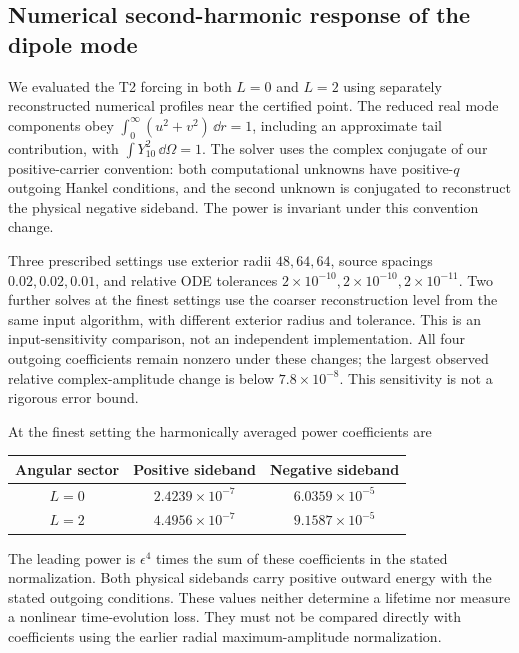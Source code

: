 \subsection{Numerical second-harmonic response of the dipole mode}
\label{nl:dipole-response}
We evaluated the T2 forcing in both $L=0$ and $L=2$ using separately
reconstructed numerical profiles near the certified point. The reduced
real mode components obey $\int_0^\infty(u^2+v^2)\,\dd r=1$, including
an approximate tail contribution, with $\int Y_{10}^2\,\dd\Omega=1$.
The solver uses the complex conjugate of our positive-carrier convention:
both computational unknowns have positive-$q$ outgoing Hankel conditions,
and the second unknown is conjugated to reconstruct the physical negative
sideband. The power is invariant under this convention change.

Three prescribed settings use exterior radii $48,64,64$, source spacings
$0.02,0.02,0.01$, and relative ODE tolerances
$2\times10^{-10},2\times10^{-10},2\times10^{-11}$. Two further solves at
the finest settings use the coarser reconstruction level from the same
input algorithm, with different exterior radius and tolerance. This is
an input-sensitivity comparison, not an independent implementation.
All four outgoing coefficients remain nonzero under these changes;
the largest observed relative complex-amplitude change is below
$7.8\times10^{-8}$. This sensitivity is not a rigorous error bound.

At the finest setting the harmonically averaged power coefficients are
\begin{center}
\begin{tabular}{ccc}
\toprule Angular sector&Positive sideband&Negative sideband\\\midrule
$L=0$&$2.4239\times10^{-7}$&$6.0359\times10^{-5}$\\
$L=2$&$4.4956\times10^{-7}$&$9.1587\times10^{-5}$\\\bottomrule
\end{tabular}
\end{center}
The leading power is $\epsilon^4$ times the sum of these coefficients in
the stated normalization. Both physical sidebands carry positive outward
energy with the stated outgoing conditions. These values neither determine a lifetime nor measure a
nonlinear time-evolution loss. They must not be compared directly with
coefficients using the earlier radial maximum-amplitude normalization.

